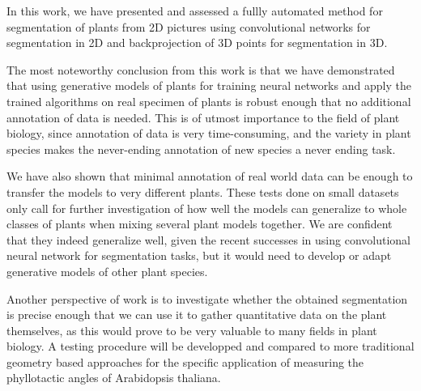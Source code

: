 In this work, we have presented and assessed a fullly automated method for segmentation of
plants from 2D pictures using convolutional networks for segmentation in 2D and
backprojection of 3D points for segmentation in 3D.

The most noteworthy conclusion from this work is that we have demonstrated that using generative
models of plants for training neural networks and apply the trained algorithms
on real specimen of plants is robust enough that no additional annotation of
data is needed. This is of utmost importance to the field of plant biology, since annotation of data
is very time-consuming, and the variety in plant species makes
the never-ending annotation of new species a never ending task.

We have also shown that minimal annotation of real world data can be enough to
transfer the models to very different plants. These tests done on small datasets
only call for further investigation of how well the models can generalize to whole
classes of plants when mixing several plant models together. We are confident
that they indeed generalize well, given the recent successes in using
convolutional neural network for segmentation tasks, but it would need to
develop or adapt generative models of other plant species.

Another perspective of work is to investigate whether the obtained segmentation is precise
enough that we can use it to gather quantitative data on the plant themselves,
as this would prove to be very valuable to many fields in plant biology. A
testing procedure will be developped and compared to more traditional geometry
based approaches for the specific application of measuring the phyllotactic
angles of Arabidopsis thaliana.
